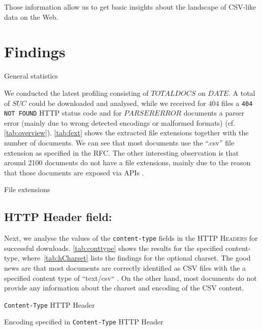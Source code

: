 \documentclass{scrartcl}
\begin{document}
Those information allow us to get basic insights about the landscape of CSV-like data on the Web. 

\section{Findings}
\begin{table}[t]
\centering

\caption{General statistics\label{tab:overview}}
\end{table}
We conducted the latest profiling consisting of $TOTALDOCS$ on $DATE$.
A total of $SUC$ could be downloaded and analysed, while we received for $404$ files a \texttt{404 NOT FOUND} HTTP status code and for $PARSERERROR$ documents a parser error (mainly due to wrong detected encodings or malformed formats) (cf. \autoref{tab:overview}). \autoref{tab:fext} shows the extracted file extensions together with the number of documents.
We can see that most documents use the ``.csv'' file extension as specified in the RFC. The other interesting observation is that around 2100 documents do not have a file extensions, mainly due to the reason that those documents are exposed via APIs  .
\begin{table}
\centering

\caption{File extensions\label{tab:fext}}
\end{table}

\subsection{HTTP Header field:}
Next, we analyse the values of the \texttt{content-type} fields in the \textsc{HTTP Headers} for successful downloads.
\autoref{tab:conttype} shows the results for the specified content-type, where~\autoref{tab:hCharset} lists the findings for the optional charset.
The good news are that most documents are correctly identified as CSV files with the a specified content type of ``text/csv`` . On the other hand, most documents do not provide any information about the charset and encoding of the CSV content.


\begin{table}[!ht]
\centering

\caption{\texttt{Content-Type} \textsc{HTTP} Header\label{tab:conttype}}
\end{table}
\begin{table}
\centering

\caption{Encoding specified in  \texttt{Content-Type} \textsc{HTTP} Header\label{tab:hCharset}}
\end{table}
\end{document}
